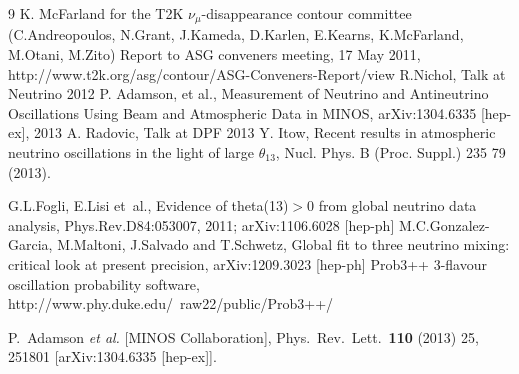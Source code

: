 \begin{thebibliography}{9}
%
%
  K. McFarland for the T2K $\nu_{\mu}$-disappearance contour committee 
  (C.Andreopoulos, N.Grant, J.Kameda, D.Karlen, E.Kearns, K.McFarland, M.Otani, M.Zito)
  Report to ASG conveners meeting, 17 May 2011,
  http://www.t2k.org/asg/contour/ASG-Conveners-Report/view
%
%
  R.Nichol,
  Talk at Neutrino 2012
  P. Adamson, et al.,
  Measurement of Neutrino and Antineutrino Oscillations Using Beam and Atmospheric Data in MINOS,
  arXiv:1304.6335 [hep-ex], 2013
  A. Radovic,
  Talk at DPF 2013
  Y. Itow,
  Recent results in atmospheric neutrino oscillations in the light of large $\theta_{13}$,
  Nucl. Phys. B (Proc. Suppl.) 235 79 (2013).

% 
%
%
%
  G.L.Fogli, E.Lisi et~al.,
  Evidence of theta(13)$>$0 from global neutrino data analysis,
  Phys.Rev.D84:053007, 2011; arXiv:1106.6028 [hep-ph]
 M.C.Gonzalez-Garcia, M.Maltoni, J.Salvado and T.Schwetz,
 Global fit to three neutrino mixing: critical look at present precision,
 arXiv:1209.3023 [hep-ph]
%
%
%
%
 Prob3++ 3-flavour oscillation probability software,
 http://www.phy.duke.edu/~raw22/public/Prob3++/
 
  P.~Adamson {\it et al.}  [MINOS Collaboration],
  Phys.\ Rev.\ Lett.\  {\bf 110} (2013) 25,  251801
  [arXiv:1304.6335 [hep-ex]].

\end{thebibliography}


